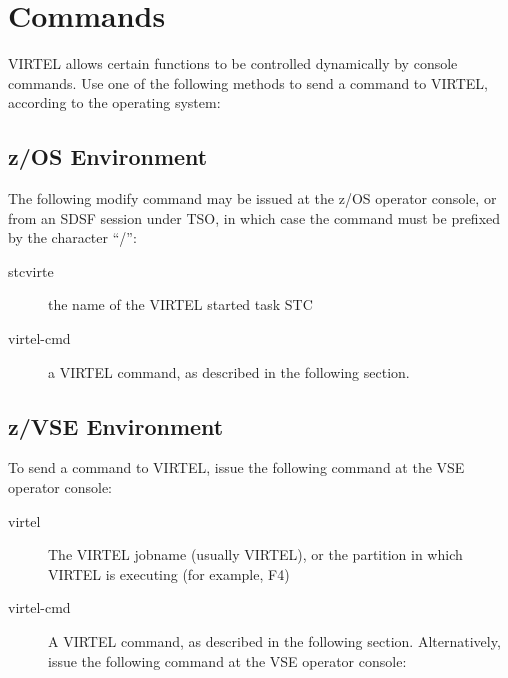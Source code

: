 \documentclass[letterpaper,10pt,english]{sphinxmanual}
\begin{document}
\section{Commands}
\label{\detokenize{audit_operations_ and_performance:commands}}\label{\detokenize{audit_operations_ and_performance:index-0}}
VIRTEL allows certain functions to be controlled dynamically by console commands. Use one of the following methods to send a command to VIRTEL, according to the operating system:


\subsection{z/OS Environment}
\label{\detokenize{audit_operations_ and_performance:index-1}}\label{\detokenize{audit_operations_ and_performance:z-os-environment}}
The following modify command may be issued at the z/OS operator console, or from an SDSF session under TSO, in which case the command must be prefixed by the character “/”:

\begin{sphinxVerbatim}[commandchars=\\\{\}]
 
\end{sphinxVerbatim}
\begin{description}
\item[{stcvirte}] \leavevmode
the name of the VIRTEL started task STC

\item[{virtel-cmd}] \leavevmode
a VIRTEL command, as described in the following section.

\end{description}


\subsection{z/VSE Environment}
\label{\detokenize{audit_operations_ and_performance:z-vse-environment}}\label{\detokenize{audit_operations_ and_performance:index-2}}
To send a command to VIRTEL, issue the following command at the VSE operator console:

\begin{sphinxVerbatim}[commandchars=\\\{\}]
 
\end{sphinxVerbatim}
\begin{description}
\item[{virtel}] \leavevmode
The VIRTEL jobname (usually VIRTEL), or the partition in which VIRTEL is executing (for example, F4)

\item[{virtel-cmd}] \leavevmode
A VIRTEL command, as described in the following section. Alternatively, issue the following command at the VSE operator console:

\end{description}
\end{document}

